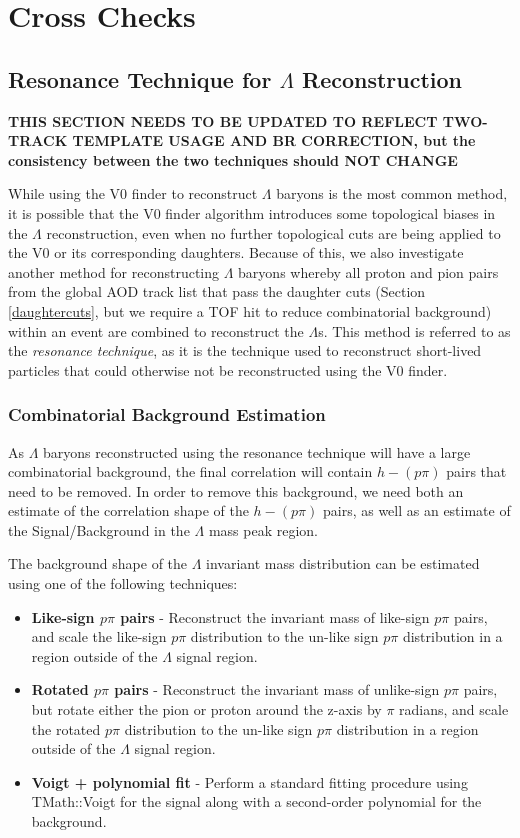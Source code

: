 \documentclass[ALICE,manyauthors]{ALICE_analysis_notes}
\begin{document}
\section{Cross Checks}
\subsection{Resonance Technique for $\Lambda$ Reconstruction}
\label{resonance_technique}

\textbf{THIS SECTION NEEDS TO BE UPDATED TO REFLECT TWO-TRACK TEMPLATE USAGE AND BR CORRECTION, but the consistency between the two techniques should NOT CHANGE}

While using the V0 finder to reconstruct $\Lambda$ baryons is the most common method, it is possible that the V0 finder algorithm introduces some topological biases in the $\Lambda$ reconstruction, even when no further topological cuts are being applied to the V0 or its corresponding daughters. Because of this, we also investigate another method for reconstructing $\Lambda$ baryons whereby all proton and pion pairs from the global AOD track list that pass the daughter cuts (Section \ref{daughtercuts}, but we require a TOF hit to reduce combinatorial background) within an event are combined to reconstruct the $\Lambda$s. This method is referred to as the \textit{resonance technique}, as it is the technique used to reconstruct short-lived particles that could otherwise not be reconstructed using the V0 finder.

\subsubsection{Combinatorial Background Estimation}
\label{combinatorial_background}

As $\Lambda$ baryons reconstructed using the resonance technique will have a large combinatorial background, the final correlation will contain $h-(p\pi)$ pairs that need to be removed. In order to remove this background, we need both an estimate of the correlation shape of the $h-(p\pi)$ pairs, as well as an estimate of the Signal/Background in the $\Lambda$ mass peak region.

 The background shape of the $\Lambda$ invariant mass distribution can be estimated using one of the following techniques:

 \begin{itemize}
	\item \textbf{Like-sign $p\pi$ pairs} - Reconstruct the invariant mass of like-sign $p\pi$ pairs, and scale the like-sign $p\pi$ distribution to the un-like sign $p\pi$ distribution in a region outside of the $\Lambda$ signal region.
	\item \textbf{Rotated $p\pi$ pairs} - Reconstruct the invariant mass of unlike-sign $p\pi$ pairs, but rotate either the pion or proton around the z-axis by $\pi$ radians, and scale the rotated $p\pi$ distribution to the un-like sign $p\pi$ distribution in a region outside of the $\Lambda$ signal region.
	\item \textbf{Voigt + polynomial fit} - Perform a standard fitting procedure using TMath::Voigt for the signal along with a second-order polynomial for the background.
 \end{itemize}
\end{document}
